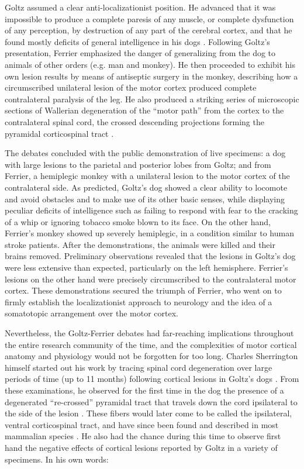 Goltz assumed a clear anti-localizationist position. He advanced that it was impossible to produce a complete paresis of any muscle, or complete dysfunction of any perception, by destruction of any part of the cerebral cortex, and that he found mostly deficits of general intelligence in his dogs \cite{Tyler2000}. Following Goltz's presentation, Ferrier emphasized the danger of generalizing from the dog to animals of other orders (e.g. man and monkey). He then proceeded to exhibit his own lesion results by means of antiseptic surgery in the monkey, describing how a circumscribed unilateral lesion of the motor cortex produced complete contralateral paralysis of the leg. He also produced a striking series of microscopic sections of Wallerian degeneration \cite{Waller1850} of the ``motor path'' from the cortex to the contralateral spinal cord, the crossed descending projections forming the pyramidal corticospinal tract \cite{Tyler2000}.

The debates concluded with the public demonstration of live specimens: a dog with large lesions to the parietal and posterior lobes from Goltz; and from Ferrier, a hemiplegic monkey with a unilateral lesion to the motor cortex of the contralateral side. As predicted, Goltz's dog showed a clear ability to locomote and avoid obstacles and to make use of its other basic senses, while displaying peculiar deficits of intelligence such as failing to respond with fear to the cracking of a whip or ignoring tobacco smoke blown to its face. On the other hand, Ferrier's monkey showed up severely hemiplegic, in a condition similar to human stroke patients. After the demonstrations, the animals were killed and their brains removed. Preliminary observations revealed that the lesions in Goltz's dog were less extensive than expected, particularly on the left hemisphere. Ferrier's lesions on the other hand were precisely circumscribed to the contralateral motor cortex. These demonstrations secured the triumph of Ferrier, who went on to firmly establish the localizationist approach to neurology and the idea of a somatotopic arrangement over the motor cortex.

Nevertheless, the Goltz-Ferrier debates had far-reaching implications throughout the entire research community of the time, and the complexities of motor cortical anatomy and physiology would not be forgotten for too long. Charles Sherrington himself started out his work by tracing spinal cord degeneration over large periods of time (up to 11 months) following cortical lesions in Goltz's dogs \cite{Langley1884,Sherrington1885}. From these examinations, he observed for the first time in the dog the presence of a degenerated ``re-crossed'' pyramidal tract that travels down the cord ipsilateral to the side of the lesion \cite{Sherrington1885}. These fibers would later come to be called the ipsilateral, ventral corticospinal tract, and have since been found and described in most mammalian species \cite{Kuypers1981,Brosamle2000,Lacroix2004}. He also had the chance during this time to observe first hand the negative effects of cortical lesions reported by Goltz in a variety of specimens. In his own words:

